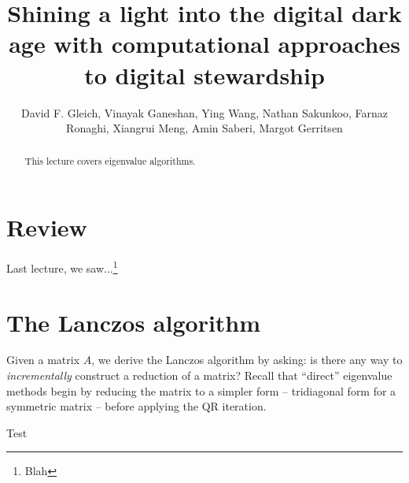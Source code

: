 \documentclass[longtitle,sidenotes]{dgleich-article}
\title{Shining a light into the digital dark age with computational approaches to digital stewardship}
\author{David F. Gleich, Vinayak Ganeshan, Ying Wang, Nathan Sakunkoo, Farnaz Ronaghi, Xiangrui Meng, Amin Saberi, Margot Gerritsen}
\begin{document}
 \maketitle

\begin{abstract}
 This lecture covers eigenvalue algorithms.
\end{abstract}

\section{Review}
Last lecture, we saw...\footnote{Blah}

\section{The Lanczos algorithm}
Given a matrix $A$, we derive the Lanczos algorithm by asking:
is there any way to \emph{incrementally} construct a reduction
of a matrix?
Recall that ``direct'' eigenvalue methods begin by reducing
the matrix to a simpler form -- tridiagonal form for a
symmetric matrix -- before applying the QR iteration.

\begin{theorem}
 Test
\end{theorem}
\end{document}
